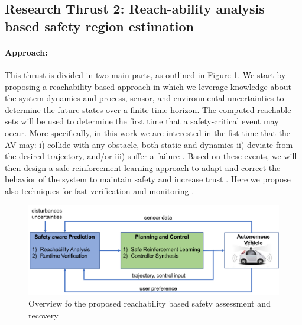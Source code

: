 
\subsection{Research Thrust 2: Reach-ability analysis based safety region estimation}
\label{sec:reachability}




\paragraph{Approach:} 
 This thrust is divided in two main parts, as outlined in Figure \ref{fig:reach}. We start by proposing a reachability-based approach in which we leverage knowledge about the system dynamics and process, sensor, and environmental uncertainties to determine the future states over a finite time horizon. The computed reachable sets will be used to determine the first time that a safety-critical event may occur. 
More specifically, in this work we are interested in the fist time that the AV may: i) collide with any obstacle, both static and dynamics ii) deviate from the desired trajectory, and/or iii) suffer a failure . Based on these events, we will then design a safe reinforcement learning approach to adapt and correct the behavior of the system to maintain safety and increase trust . Here we propose also techniques for fast verification and monitoring .

\begin{figure}
    \centering
    \includegraphics[width=0.8\columnwidth]{figures/reach.png}
    \caption{Overview fo the proposed reachability based safety assessment and recovery}
    \label{fig:reach}
\end{figure}

